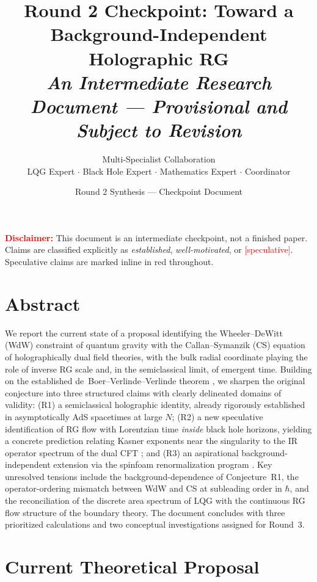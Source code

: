 \documentclass[11pt,a4paper]{article}
\title{\textbf{Round 2 Checkpoint: Toward a Background-Independent Holographic RG}\\
\large\textit{An Intermediate Research Document --- Provisional and Subject to Revision}}
\author{Multi-Specialist Collaboration\\
\small LQG Expert $\cdot$ Black Hole Expert $\cdot$ Mathematics Expert $\cdot$ Coordinator}
\date{Round 2 Synthesis --- Checkpoint Document}
\begin{document}
\maketitle
\tableofcontents
\vspace{1em}
\noindent\textcolor{red}{\textbf{Disclaimer:}} This document is an intermediate checkpoint, not a finished paper. Claims are classified explicitly as \emph{established}, \emph{well-motivated}, or \textcolor{red}{[speculative]}. Speculative claims are marked inline in red throughout.

\newpage

\section{Abstract}

We report the current state of a proposal identifying the Wheeler--DeWitt (WdW) constraint of quantum gravity with the Callan--Symanzik (CS) equation of holographically dual field theories, with the bulk radial coordinate playing the role of inverse RG scale and, in the semiclassical limit, of emergent time. Building on the established de~Boer--Verlinde--Verlinde theorem \cite{skenderis2002,witten1998}, we sharpen the original conjecture into three structured claims with clearly delineated domains of validity: (R1) a semiclassical holographic identity, already rigorously established in asymptotically AdS spacetimes at large $N$; (R2) a new speculative identification of RG flow with Lorentzian time \emph{inside} black hole horizons, yielding a concrete prediction relating Kasner exponents near the singularity to the IR operator spectrum of the dual CFT \cite{maldacena1997}; and (R3) an aspirational background-independent extension via the spinfoam renormalization program \cite{ashtekar2004,thiemann1996}. Key unresolved tensions include the background-dependence of Conjecture~R1, the operator-ordering mismatch between WdW and CS at subleading order in $\hbar$, and the reconciliation of the discrete area spectrum of LQG with the continuous RG flow structure of the boundary theory. The document concludes with three prioritized calculations and two conceptual investigations assigned for Round~3.

\section{Current Theoretical Proposal}
\end{document}
